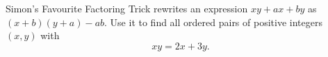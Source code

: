 Simon's Favourite Factoring Trick rewrites an expression $xy+ax+by$ as $(x+b)(y+a)-ab$. Use it to find all ordered pairs of positive integers $(x,y)$ with
\[
xy=2x+3y .
\]
